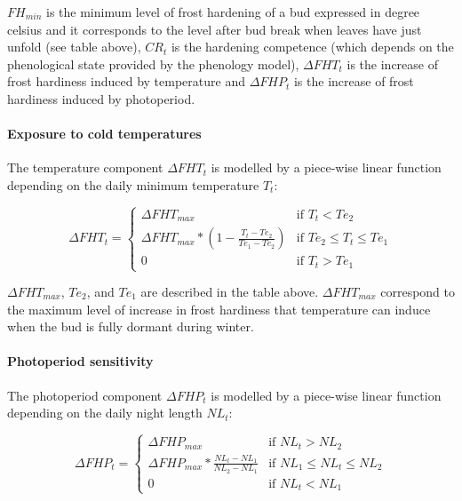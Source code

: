 \documentclass[preprint,12pt,authoryear]{elsarticle}
\begin{document}
{\noindent $FH_{min}$ is the minimum level of frost hardening of a bud expressed in degree celsius and it corresponds to the level after bud break when leaves have just unfold (see table above), $CR_t$ is the hardening competence (which depends on the phenological state provided by the phenology model), $\Delta FHT_t$ is the increase of frost hardiness induced by temperature and $\Delta FHP_t$ is the increase of frost hardiness induced by photoperiod.

\paragraph{Exposure to cold temperatures}

The temperature component $\Delta FHT_t$ is modelled by a piece-wise linear function depending on the daily minimum temperature $T_t$:

\begin{equation}
  \Delta FHT_t =
    \begin{cases}
      \Delta FHT_{max} & \text{if $T_t < Te_2$}\\
      \Delta FHT_{max}*(1-\frac{T_t-Te_2}{Te_1-Te_2}) & \text{if $Te_2 \leq T_t \leq Te_1$}\\
      0 & \text{if $T_t > Te_1$}
    \end{cases}       
\end{equation}

\noindent $\Delta FHT_{max}$, $Te_2$, and $Te_1$ are described in the table above. $\Delta FHT_{max}$ correspond to the maximum level of increase in frost hardiness that temperature can induce when the bud is fully dormant during winter.

\paragraph{Photoperiod sensitivity}

The photoperiod component $\Delta FHP_t$ is modelled by a piece-wise linear function depending on the daily night length $NL_t$:

\begin{equation}
  \Delta FHP_t =
    \begin{cases}
      \Delta FHP_{max} & \text{if $NL_t > NL_2$}\\
      \Delta FHP_{max}*\frac{NL_t-NL_1}{NL_2-NL_1} & \text{if $NL_1 \leq NL_t \leq NL_2$}\\
      0 & \text{if $NL_t < NL_1$}
    \end{cases}       
\end{equation}

}
\end{document}
